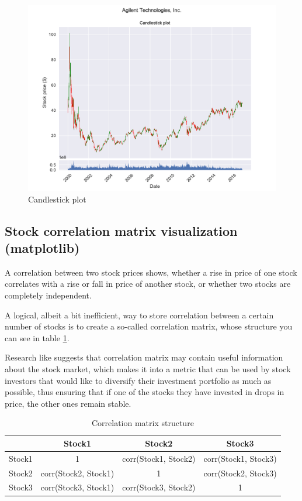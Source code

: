 \documentclass[12pt, a4paper]{article}
\begin{document}
\begin{figure}[H]
    \centering
    \includegraphics[width=\textwidth]{src/stocks/simple/candlestick}
    \caption{Candlestick plot}
    \label{fig:stock_candlestick}
\end{figure}


\newpage
\subsection{Stock correlation matrix visualization (matplotlib)} \label{ssec:stock_corr}

A correlation between two stock prices shows, whether a rise in price of one stock correlates with a rise or fall in price of another stock, or whether two stocks are completely independent.

A logical, albeit a bit inefficient, way to store correlation between a certain number of stocks is to create a so-called correlation matrix, whose structure you can see in table \ref{table:corr}.

Research like \cite{kwapien2006bulk} suggests that correlation matrix may contain useful information about the stock market, which makes it into a metric that can be used by stock investors that would like to diversify their investment portfolio as much as possible, thus ensuring that if one of the stocks they have invested in drops in price, the other ones remain stable.

\begin{table}[h!]
\centering
\caption{Correlation matrix structure}
\begin{tabular}{ | c | c | c | c | }
  \hline
  \ & Stock1 & Stock2 & Stock3 \\
  \hline
  Stock1 & 1 & corr(Stock1, Stock2) & corr(Stock1, Stock3) \\
  \hline
  Stock2 & corr(Stock2, Stock1) & 1 & corr(Stock2, Stock3) \\
  \hline
  Stock3 & corr(Stock3, Stock1) & corr(Stock3, Stock2) & 1 \\
  \hline
\end{tabular}
\label{table:corr}
\end{table}
\end{document}
